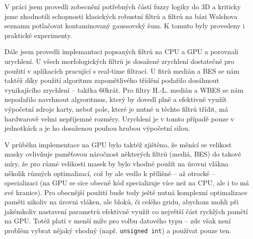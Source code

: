 
V práci jsem provedli zobecnění potřebných částí fuzzy logiky do 3D a kriticky jsme zhodnotili schopnosti klasických robustní filtrů a filtrů na bázi Walshova seznamu potlačovat kontaminovaný gaussovský šum. K tomuto byly provedeny i praktické experimenty.

Dále jsem provedli implemantaci popsaných filtrů na CPU a GPU a porovnali urychlení. U všech morfologických filtrů je dosažené zrychlení dostatečné pro použití v aplikacích pracující s real-time filtrací. U fitrů medián a BES se nám taktéž díky použití algoritmu zapomětlivého třídění podařilo dosáhnout vynikajícího zrychlení -- takřka 60krát. Pro filtry H.-L. medián a WBES se nám nepodařilo navrhnout algroritmus, který by dovedl plně a efektivně využít výpočetní zdroje karty, neboť pole, které je nutné u těchto filtrů třídit, má hardwarově velmi nepříjemné rozměry. Urychlení je v tomto případě pouze v jednotkách a je ho dosaženou pouhou hrubou výpočetní silou.

V průběhu implementace na GPU bylo taktéž zjištěno, že měnící se velikost masky ovlivňuje paměťovou náročnost některých filtrů (mediá, BES) do takové míry, že pro různé velikosti masek by bylo vhodné použít na úrovni vlákna několik různých optimalizací, což by ale vedlo k přílišné -- až otrocké -- specializaci (na GPU se sice obecně kód specializuje více než na CPU, ale i to má své hranice). Pro obecnější použití bude tedy ještě nutná komplexní optimalizace paměti nikoliv na úrovni vláken, ale bloků, či celého gridu, abychom mohli při jakémkoliv nastavení parametrů efektivně využít co největší část rychlých pamětí na GPU. Totéž platí v menší míře pro volbu datového typu -- zde však není problém vybrat nějaký vhodný (např. {\tt unsigned int}) a používat pouze ten.
